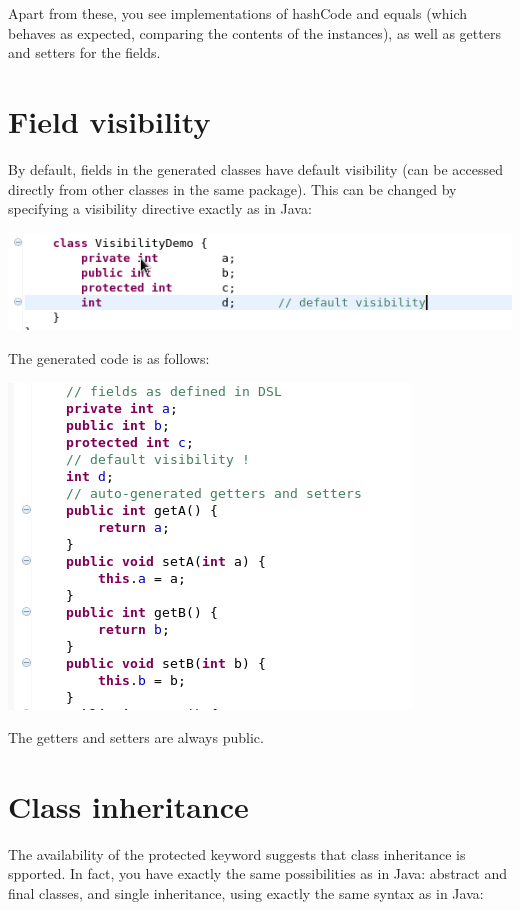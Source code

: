 \documentclass[11pt,a4paper,oneside]{article}
\begin{document}
Apart from these, you see implementations of {\ttfamily hashCode} and {\ttfamily equals} (which behaves as expected, comparing the contents of
the instances), as well as getters and setters for the fields.

\section{Field visibility}
By default, fields in the generated classes have default visibility (can be accessed directly from other classes in the same package). This can be changed by
specifying a visibility directive exactly as in Java:

\vspace{2mm}
\hspace{1cm}\includegraphics[scale=0.5]{images/tut1-006.png}

\noindent The generated code is as follows:

\vspace{2mm}
\hspace{1cm}\includegraphics[scale=0.5]{images/tut1-008.png}

\noindent The getters and setters are always public.

\section{Class inheritance}
The availability of the {\ttfamily protected} keyword suggests that class inheritance is spported. In fact, you have exactly the same
possibilities as in Java: abstract and final classes, and single inheritance, using exactly the same syntax as in Java:
\end{document}
